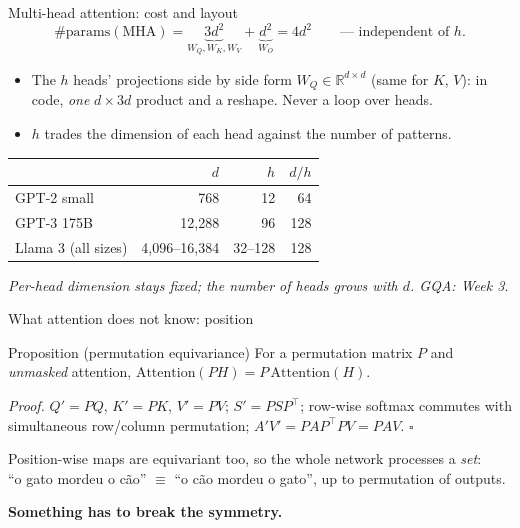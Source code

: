 \documentclass[11pt,aspectratio=169]{beamer}
\newcommand{\R}{\mathbb{R}}
\newcommand{\MHA}{\mathrm{MHA}}
\newcommand{\T}{^{\top}}
\newcommand{\dest}[1]{\textcolor{structure}{\textbf{#1}}}
\newcommand{\hook}[1]{{\small\textcolor{gray!60!black}{\textit{#1}}}}
\begin{document}
\begin{frame}{Multi-head attention: cost and layout}
  \[
    \#\text{params}(\MHA) = \underbrace{3d^2}_{W_Q,W_K,W_V} + \underbrace{d^2}_{W_O} = 4d^2
    \qquad\text{--- independent of } h.
  \]

  \vspace{0.6em}
  \begin{itemize}
    \item The $h$ heads' projections side by side form $W_Q\in\R^{d\times d}$ (same for
          $K$, $V$): in code, \emph{one} $d\times 3d$ product and a reshape. Never a loop
          over heads.
    \item $h$ trades the dimension of each head against the number of patterns.
  \end{itemize}

  \vspace{0.6em}
  \begin{center}
  \begin{tabular}{@{}lrrr@{}}
    \toprule
    & $d$ & $h$ & $d/h$ \\
    \midrule
    GPT-2 small & 768 & 12 & 64 \\
    GPT-3 175B & 12{,}288 & 96 & 128 \\
    Llama 3 (all sizes) & 4{,}096--16{,}384 & 32--128 & 128 \\
    \bottomrule
  \end{tabular}
  \end{center}
  \hook{Per-head dimension stays fixed; the number of heads grows with $d$. GQA: Week 3.}
\end{frame}

\begin{frame}{What attention does not know: position}
  \begin{block}{Proposition (permutation equivariance)}
    For a permutation matrix $P$ and \emph{unmasked} attention,
    $\mathrm{Attention}(PH) = P\,\mathrm{Attention}(H)$.
  \end{block}

  \vspace{0.5em}
  \emph{Proof.} $Q' = PQ$, $K' = PK$, $V' = PV$; $S' = PSP\T$; row-wise softmax commutes
  with simultaneous row/column permutation; $A'V' = PAP\T PV = PAV$. $\square$

  \vspace{0.8em}
  Position-wise maps are equivariant too, so the whole network processes a \emph{set}:\\
  ``o gato mordeu o cão'' $\equiv$ ``o cão mordeu o gato'', up to permutation of outputs.

  \vspace{0.5em}
  \dest{Something has to break the symmetry.}
\end{frame}
\end{document}

